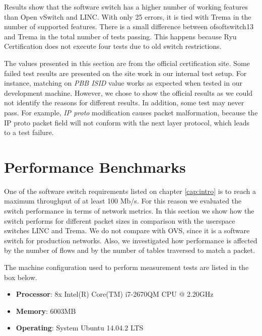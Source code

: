 Results show that the software switch has a higher number of working features than Open vSwitch and LINC. With only 25 errors, it is tied with Trema in the number of supported features. There is a small difference between ofsoftswitch13 and Trema in the total number of tests passing. This happens because Ryu Certification does not execute four tests due to old switch restrictions.

The values presented in this section are from the official certification site. Some failed test results are presented on the site work in our internal test setup. For instance, matching on \textit{PBB ISID} value works as expected when tested in our development machine. However, we chose to show the official results as we could not identify the reasons for different results. In addition, some test may never pass. For example, \textit{IP proto} modification causes packet malformation, because the IP proto packet field will not conform with the next layer protocol, which leads to a test failure. 

\section{Performance Benchmarks}

One of the software switch requirements listed on chapter \ref{cap:intro} is to reach a maximum throughput of at least 100 Mb/s. For this reason we evaluated the switch performance in terms of network metrics. In this section we show how the switch performs for different packet sizes in comparison with the userspace switches LINC and Trema. We do not compare with OVS, since it is a software switch for production networks. Also, we investigated how performance is affected by the number of flows and by the number of tables traversed to match a packet.  

The machine configuration used to perform measurement tests are listed in the box below. 

\begin{framed}

\begin{itemize}
\item \textbf{Processor}:	8x Intel(R) Core(TM) i7-2670QM CPU @ 2.20GHz
\item \textbf{Memory}:	6003MB 
\item \textbf{Operating}: System	Ubuntu 14.04.2 LTS
\end{itemize}

\end{framed}

